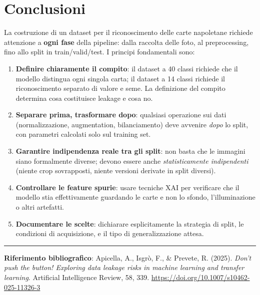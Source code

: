 \documentclass[a4paper,12pt]{article}
\begin{document}
\section{Conclusioni}

La costruzione di un dataset per il riconoscimento delle carte napoletane richiede attenzione a \textbf{ogni fase} della pipeline: dalla raccolta delle foto, al preprocessing, fino allo split in train/valid/test. I principi fondamentali sono:

\begin{enumerate}
    \item \textbf{Definire chiaramente il compito}: il dataset a 40 classi richiede che il modello distingua ogni singola carta; il dataset a 14 classi richiede il riconoscimento separato di valore e seme. La definizione del compito determina cosa costituisce leakage e cosa no.
    
    \item \textbf{Separare prima, trasformare dopo}: qualsiasi operazione sui dati (normalizzazione, augmentation, bilanciamento) deve avvenire \emph{dopo} lo split, con parametri calcolati solo sul training set.
    
    \item \textbf{Garantire indipendenza reale tra gli split}: non basta che le immagini siano formalmente diverse; devono essere anche \emph{statisticamente indipendenti} (niente crop sovrapposti, niente versioni derivate in split diversi).
    
    \item \textbf{Controllare le feature spurie}: usare tecniche XAI per verificare che il modello stia effettivamente guardando le carte e non lo sfondo, l'illuminazione o altri artefatti.
    
    \item \textbf{Documentare le scelte}: dichiarare esplicitamente la strategia di split, le condizioni di acquisizione, e il tipo di generalizzazione attesa.
\end{enumerate}

\vspace{1em}
\noindent\rule{\textwidth}{0.4pt}
\small
\noindent\textbf{Riferimento bibliografico}: Apicella, A., Isgrò, F., \& Prevete, R. (2025). \emph{Don't push the button! Exploring data leakage risks in machine learning and transfer learning}. Artificial Intelligence Review, 58, 339. \url{https://doi.org/10.1007/s10462-025-11326-3}
\end{document}
